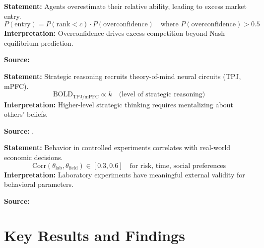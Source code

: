 \begin{tcolorbox}[colback=gray!5!white, colframe=gray!75!black,
    title=Axiom CA-4: Overconfidence in Competition]
\textbf{Statement:} Agents overestimate their relative ability, leading to excess market entry.
\begin{equation}
P(\text{entry}) = P(\text{rank} < c) \cdot P(\text{overconfidence}) \quad \text{where } P(\text{overconfidence}) > 0.5
\end{equation}
\textbf{Interpretation:} Overconfidence drives excess competition beyond Nash equilibrium prediction.

\textbf{Source:} \citet{PAP-camerer1999overconfidence}
\end{tcolorbox}

\begin{tcolorbox}[colback=gray!5!white, colframe=gray!75!black,
    title=Axiom CA-5: Theory of Mind Integration]
\textbf{Statement:} Strategic reasoning recruits theory-of-mind neural circuits (TPJ, mPFC).
\begin{equation}
\text{BOLD}_{\text{TPJ/mPFC}} \propto k \quad \text{(level of strategic reasoning)}
\end{equation}
\textbf{Interpretation:} Higher-level strategic thinking requires mentalizing about others' beliefs.

\textbf{Source:} \citet{PAP-camerer2010levels}, \citet{PAP-camerer2017reading}
\end{tcolorbox}

\begin{tcolorbox}[colback=gray!5!white, colframe=gray!75!black,
    title=Axiom CA-6: Lab-Field Correspondence]
\textbf{Statement:} Behavior in controlled experiments correlates with real-world economic decisions.
\begin{equation}
\text{Corr}(\theta_{\text{lab}}, \theta_{\text{field}}) \in [0.3, 0.6] \quad \text{for risk, time, social preferences}
\end{equation}
\textbf{Interpretation:} Laboratory experiments have meaningful external validity for behavioral parameters.

\textbf{Source:} \citet{camerer2016risk}
\end{tcolorbox}


\section{Key Results and Findings}
\label{sec:ca-results}

